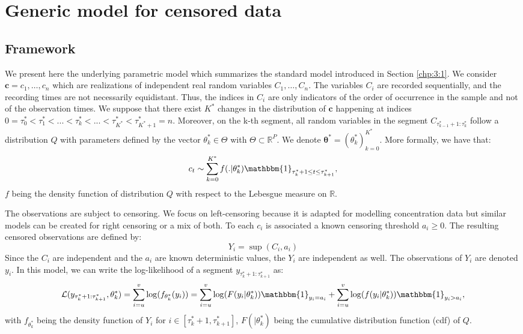 \section{Generic model for censored data}\label{chp:4:1}

\subsection{Framework}

We present here the underlying parametric model which summarizes the standard model introduced in Section \ref{chp:3:1}. We consider $\bm c = c_1,\dots,c_n$ which are realizations of independent real random variables $C_1,\dots,C_n$. The variables $C_i$ are recorded sequentially, and the recording times are not necessarily equidistant. Thus, the indices in $C_i$ are only indicators of the order of occurrence in the sample and not of the observation times. We suppose that there exist $K^*$ changes in the distribution of $\bm c$ happening at indices $0=\tau_0^*<\tau^*_1 <... < \tau^*_k <... < \tau^*_{K^*}<\tau^*_{K^*+1}=n$. Moreover, on the k-th segment, all random variables in the segment $C_{\tau^*_{k-1}+1:\tau^*_{k}}$ follow a distribution $Q$ with parameters defined by the vector $\theta^*_k\in\Theta$ with $\Theta\subset\mathbb{R}^P$. We denote $\bm{\theta^*} = (\theta^*_k)_{k=0}^{K^*}$. More formally, we have that:  
$$c_t \sim \sum_{k=0}^{K^*} f(.\vert\theta^*_k)\mathbbm{1}_{\tau^*_{k}+1\leq t \leq \tau^*_{k+1}},$$
$f$ being the density function of distribution $Q$ with respect to the Lebesgue measure on $\mathbb{R}$.  


The observations are subject to censoring. We focus on left-censoring because it is adapted for modelling concentration data but similar models can be created for right censoring or a mix of both. To each $c_i$ is associated a known censoring threshold $a_i \ge 0$. The resulting censored observations are defined by:  
\begin{equation}\label{chp:4:defy}
Y_i = \sup(C_i,a_i)
\end{equation}
Since the $C_i$ are independent and the $a_i$ are known deterministic values, the $Y_i$ are independent as well. The observations of $Y_i$ are denoted $y_i$. In this model, we can write the log-likelihood of a segment $y_{\tau^*_k+1:\tau^*_{k+1}}$ as:  
\begin{equation}\label{chp:4:loglik}
\mathcal{L}(y_{\tau^*_k+1:\tau^*_{k+1}},\theta^*_k) = \sum_{i = u}^v\log(f_{\theta^*_k}(y_i)) = \sum_{i = u}^v\log(F(y_i\vert\theta^*_k))\mathbbm{1}_{y_i=a_i}+\sum_{i = u}^v\log(f(y_i \vert\theta^*_k))\mathbbm{1}_{y_i>a_i},
\end{equation}
with $f_{\theta^*_k}$ being the density function of $Y_i$ for $i \in [\tau^*_k+1,\tau^*_{k+1}]$, $F(\vert\theta^*_k)$ being the cumulative distribution function (cdf) of $Q$. 

